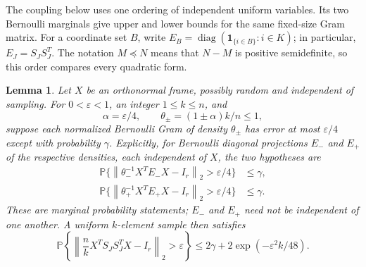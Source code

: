\documentclass[11pt]{article}
\newtheorem{lemma}[theorem]{Lemma}
\theoremstyle{definition}
\theoremstyle{remark}
\theoremstyle{plain}
\newcommand{\Prob}{\mathbb P}
\newcommand{\one}{\mathbf 1}
\newcommand{\norm}[1]{\left\lVert#1\right\rVert_2}
\begin{document}
The coupling below uses one ordering of independent uniform
variables. Its two Bernoulli marginals give upper and lower bounds
for the same fixed-size Gram matrix. For a coordinate set $B$, write
$E_B=\operatorname{diag}(\one_{\{i\in B\}}:i\in K)$; in particular,
$E_J=S_JS_J^T$. The notation $M\preceq N$ means that $N-M$ is positive
semidefinite, so this order compares every quadratic form.

\begin{lemma}\label{lem:sampling}
Let \(X\) be an orthonormal frame, possibly random and independent
of sampling. For \(0<\varepsilon<1\), an integer \(1\le k\le n\),
and
\[
 \alpha=\varepsilon/4,\qquad
 \theta_\pm=(1\pm\alpha)k/n\le1,
\]
suppose each normalized Bernoulli Gram of density \(\theta_\pm\)
has error at most \(\varepsilon/4\) except with probability
\(\gamma\). Explicitly, for Bernoulli diagonal projections $E_-$
and $E_+$ of the respective densities, each independent of $X$,
the two hypotheses are
\begin{equation}\label{eq:sampling-hypotheses}
\begin{aligned}
 \Prob\{\norm{\theta_-^{-1}X^TE_-X-I_r}>\varepsilon/4\}
          &\le\gamma,\\
 \Prob\{\norm{\theta_+^{-1}X^TE_+X-I_r}>\varepsilon/4\}
          &\le\gamma.
\end{aligned}
\end{equation}
These are marginal probability statements; $E_-$ and $E_+$ need
not be independent of one another. A uniform \(k\)-element sample
then satisfies
\begin{equation}\label{eq:sampling-bound}
 \Prob\left\{\norm{\frac nk X^TS_JS_J^TX-I_r}>\varepsilon\right\}
 \le2\gamma+2\exp(-\varepsilon^2 k/48).
\end{equation}
\end{lemma}
\end{document}

